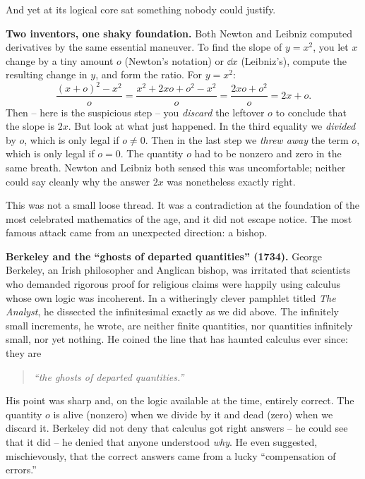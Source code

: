 And yet at its logical core sat something nobody could justify.

\begin{historybox}
\textbf{Two inventors, one shaky foundation.} Both Newton and Leibniz computed derivatives by
the same essential maneuver. To find the slope of $y = x^2$, you let $x$ change by a tiny amount
$o$ (Newton's notation) or $\dd x$ (Leibniz's), compute the resulting change in $y$, and form the
ratio. For $y = x^2$:
\[
  \frac{(x+o)^2 - x^2}{o}
  = \frac{x^2 + 2xo + o^2 - x^2}{o}
  = \frac{2xo + o^2}{o}
  = 2x + o.
\]
Then -- here is the suspicious step -- you \emph{discard} the leftover $o$ to conclude that the
slope is $2x$. But look at what just happened. In the third equality we \emph{divided} by $o$,
which is only legal if $o \neq 0$. Then in the last step we \emph{threw away} the term $o$, which
is only legal if $o = 0$. The quantity $o$ had to be nonzero and zero in the same breath. Newton
and Leibniz both sensed this was uncomfortable; neither could say cleanly why the answer $2x$
was nonetheless exactly right.
\end{historybox}

This was not a small loose thread. It was a contradiction at the foundation of the most
celebrated mathematics of the age, and it did not escape notice. The most famous attack came from
an unexpected direction: a bishop.

\begin{historybox}
\textbf{Berkeley and the ``ghosts of departed quantities'' (1734).} George Berkeley, an Irish
philosopher and Anglican bishop, was irritated that scientists who demanded rigorous proof for
religious claims were happily using calculus whose own logic was incoherent. In a witheringly
clever pamphlet titled \emph{The Analyst}, he dissected the infinitesimal exactly as we did
above. The infinitely small increments, he wrote, are neither finite quantities, nor quantities
infinitely small, nor yet nothing. He coined the line that has haunted calculus ever since: they
are
\begin{quote}
\emph{``the ghosts of departed quantities.''}
\end{quote}
His point was sharp and, on the logic available at the time, entirely correct. The quantity $o$
is alive (nonzero) when we divide by it and dead (zero) when we discard it. Berkeley did not deny
that calculus got right answers -- he could see that it did -- he denied that anyone understood
\emph{why}. He even suggested, mischievously, that the correct answers came from a lucky
``compensation of errors.''
\end{historybox}

